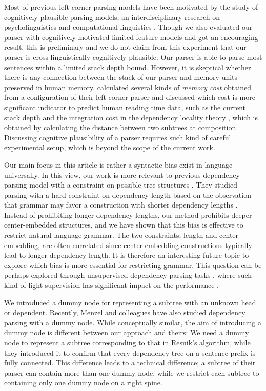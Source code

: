 \documentclass[english]{jnlp_1.4}
\begin{document}
Most of previous left-corner parsing models have been motivated by the study of cognitively plausible parsing models, an interdisciplinary research on psycholinguistics and computational linguistics \cite{keller:2010:Short}.
Though we also evaluated our parser with cognitively motivated limited feature models and got an encouraging result, this is preliminary and we do not claim from this experiment that our parser is cross-linguistically cognitively plausible.
Our parser is able to parse most sentences within a limited stack depth bound.
However, it is skeptical whether there is any connection between the stack of our parser and memory units preserved in human memory.
 calculated several kinds of {\it memory cost} obtained from a configuration of their left-corner parser and discussed which cost is more significant indicator to predict human reading time data, such as the current stack depth and the integration cost in the dependency locality theory \cite{Gibson2000The-dependency-}, which is obtained by calculating the distance between two subtrees at composition.
Discussing cognitive plausibility of a parser requires such kind of careful experimental setup, which is beyond the scope of the current work.

Our main focus in this article is rather a syntactic bias exist in language universally.
In this view, our work is more relevant to previous dependency parsing model with a constraint on possible tree structures \cite{eisner2010}.
They studied parsing with a hard constraint on dependency length based on the observation that grammar may favor a construction with shorter dependency lengths \cite{gildea-temperley:2007:ACLMain,DBLP:journals/cogsci/GildeaT10}.
Instead of prohibiting longer dependency lengths, our method prohibits deeper center-embedded structures, and we have shown that this bias is effective to restrict natural language grammar.
The two constraints, length and center-embedding, are often correlated since center-embedding constructions typically lead to longer dependency length.
It is therefore an interesting future topic to explore which bias is more essential for restricting grammar.
This question can be perhaps explored through unsupervised dependency parsing tasks \cite{klein-manning:2004:ACL}, where such kind of light supervision has significant impact on the performance \cite{smith-eisner-2006-acl-sa,marevcek-vzabokrtsky:2012:EMNLP-CoNLL,DBLP:journals/tacl/BiskH13}.

We introduced a dummy node for representing a subtree with an unknown head or dependent.
Recently, Menzel and colleagues \cite{beuck2013,kohn-menzel:2014:ACL} have also studied dependency parsing with a dummy node.
While conceptually similar, the aim of introducing a dummy node is different between our approach and theirs:
We need a dummy node to represent a subtree corresponding to that in Resnik's algorithm, while they introduced it to confirm that every dependency tree on a sentence prefix is fully connected.
This difference leads to a technical difference; a subtree of their parser can contain more than one dummy node, while we restrict each subtree to containing only one dummy node on a right spine.
\end{document}
